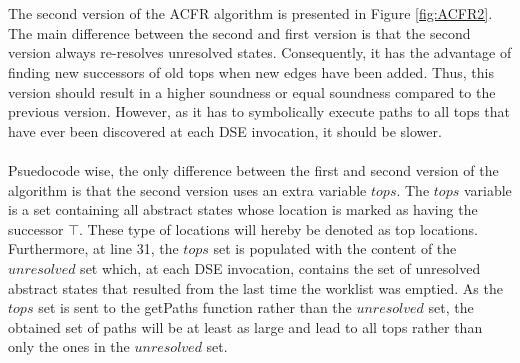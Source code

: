 \documentclass{kththesis}
\begin{document}
\\ \\
The second version of the ACFR algorithm is presented in Figure \ref{fig:ACFR2}. The main difference between the second and first version is that the second version always re-resolves unresolved states. Consequently, it has the advantage of finding new successors of old tops when new edges have been added. Thus, this version should result in a higher soundness or equal soundness compared to the previous version. However, as it has to symbolically execute paths to all tops that have ever been discovered at each DSE invocation, it should be slower.
\\ \\
Psuedocode wise, the only difference between the first and second version of the algorithm is that the second version uses an extra variable $tops$. The $tops$ variable is a set containing all abstract states whose location is marked as having the successor $\top$. These type of locations will hereby be denoted as top locations. Furthermore, at line 31, the $tops$ set is populated with the content of the $unresolved$ set which, at each DSE invocation, contains the set of unresolved abstract states that resulted from the last time the worklist was emptied. As the $tops$ set is sent to the getPaths function rather than the $unresolved$ set, the obtained set of paths will be at least as large and lead to all tops rather than only the ones in the $unresolved$ set.


\end{document}
